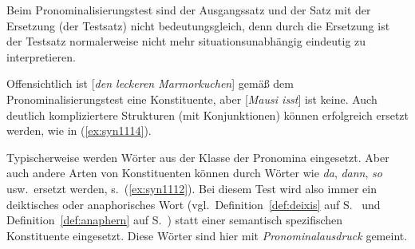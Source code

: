 Beim Pronominalisierungstest sind der Ausgangssatz und der Satz mit der Ersetzung (der Testsatz) nicht bedeutungsgleich, denn durch die Ersetzung ist der Testsatz normalerweise nicht mehr situationsunabhängig eindeutig zu interpretieren.

\begin{exe}
  \ex\label{ex:syn1111}
  \begin{xlist}
  \end{xlist}
\end{exe}

Offensichtlich ist [\textit{den leckeren Marmorkuchen}] gemäß dem Pronominalisierungstest eine Konstituente, aber [\textit{Mausi isst}] ist keine.
Auch deutlich kompliziertere Strukturen (\zB mit Konjunktionen) können erfolgreich ersetzt werden, wie in (\ref{ex:syn1114}).

\begin{exe}
\end{exe}

Typischerweise werden Wörter aus der Klasse der Pronomina eingesetzt.
Aber auch andere Arten von Konstituenten können durch Wörter wie \textit{da}, \textit{dann}, \textit{so} usw.\ ersetzt werden, s.\ (\ref{ex:syn1112}).
Bei diesem Test wird also immer ein deiktisches oder anaphorisches Wort (vgl.\ Definition~\ref{def:deixis} auf S.~\pageref{def:deixis} und Definition~\ref{def:anaphern} auf S.~\pageref{def:anaphern}) statt einer semantisch spezifischen Konstituente eingesetzt.
Diese Wörter sind hier mit \textit{Pronominalausdruck} gemeint.

\begin{exe}
\end{exe}

